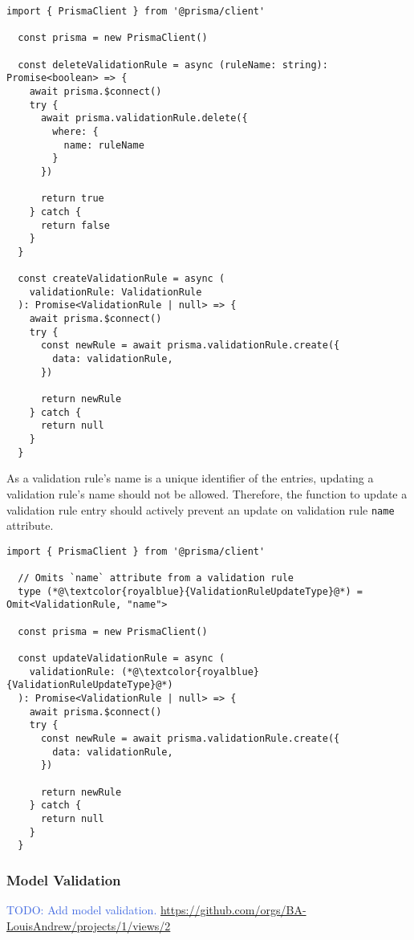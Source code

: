   \begin{lstlisting}[style=es6, caption={Creating a new validation rule and deleting an existing entry based on its name (TypeScript)}]
  import { PrismaClient } from '@prisma/client'

  const prisma = new PrismaClient()

  const deleteValidationRule = async (ruleName: string): Promise<boolean> => {
    await prisma.$connect()
    try {
      await prisma.validationRule.delete({
        where: {
          name: ruleName
        }
      })

      return true
    } catch {
      return false
    }
  }
  
  const createValidationRule = async (
    validationRule: ValidationRule
  ): Promise<ValidationRule | null> => {
    await prisma.$connect()
    try {
      const newRule = await prisma.validationRule.create({
        data: validationRule,
      })
  
      return newRule
    } catch {
      return null
    }
  }
  \end{lstlisting}  

  As a validation rule's name is a unique identifier of the entries, updating a validation rule's name should not be allowed. Therefore, the function to update a validation rule entry should actively prevent an update on validation rule \verb;name; attribute. 

  \begin{lstlisting}[style=es6, caption={Getting an existing validation rule based on its name in the database (TypeScript)}]
  import { PrismaClient } from '@prisma/client'

  // Omits `name` attribute from a validation rule
  type (*@\textcolor{royalblue}{ValidationRuleUpdateType}@*) = Omit<ValidationRule, "name"> 

  const prisma = new PrismaClient()
  
  const updateValidationRule = async (
    validationRule: (*@\textcolor{royalblue}{ValidationRuleUpdateType}@*)
  ): Promise<ValidationRule | null> => {
    await prisma.$connect()
    try {
      const newRule = await prisma.validationRule.create({
        data: validationRule,
      })
  
      return newRule
    } catch {
      return null
    }
  }
  \end{lstlisting}  

    \subsubsection{Model Validation}
      \textcolor{royalblue}{TODO: Add model validation. \url{https://github.com/orgs/BA-LouisAndrew/projects/1/views/2}}